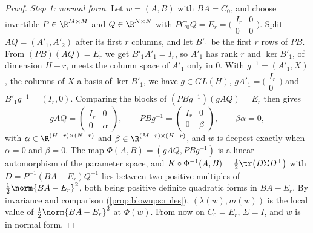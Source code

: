 \begin{refsection}
\begin{proof}
\emph{Step 1: normal form.} Let $w=(A,B)$ with $BA=C_0$, and choose invertible $P\in\R^{M\times M}$ and $Q\in\R^{N\times N}$ with $PC_0Q=E_r=\bigl(\begin{smallmatrix}I_r&0\\0&0\end{smallmatrix}\bigr)$. Split $AQ=(A'_1,A'_2)$ after its first $r$ columns, and let $B'_1$ be the first $r$ rows of $PB$. From $(PB)(AQ)=E_r$ we get $B'_1A'_1=I_r$, so $A'_1$ has rank $r$ and $\ker B'_1$, of dimension $H-r$, meets the column space of $A'_1$ only in $0$. With $g^{-1}=(A'_1,X)$, the columns of $X$ a basis of $\ker B'_1$, we have $g\in GL(H)$, $gA'_1=\bigl(\begin{smallmatrix}I_r\\0\end{smallmatrix}\bigr)$ and $B'_1g^{-1}=(I_r,0)$. Comparing the blocks of $(PBg^{-1})(gAQ)=E_r$ then gives
\[
gAQ=\begin{pmatrix}I_r&0\\0&\alpha\end{pmatrix},\qquad PBg^{-1}=\begin{pmatrix}I_r&0\\0&\beta\end{pmatrix},\qquad\beta\alpha=0,
\]
with $\alpha\in\R^{(H-r)\times(N-r)}$ and $\beta\in\R^{(M-r)\times(H-r)}$, and $w$ is deepest exactly when $\alpha=0$ and $\beta=0$. The map $\Phi(A,B)=(gAQ,PBg^{-1})$ is a linear automorphism of the parameter space, and $K\circ\Phi^{-1}(A,B)=\frac12\tr\bigl(D\Sigma D^\top\bigr)$ with $D=P^{-1}(BA-E_r)Q^{-1}$ lies between two positive multiples of $\frac12\norm{BA-E_r}^2$, both being positive definite quadratic forms in $BA-E_r$. By invariance and comparison (\cref{prop:blowups:rules}), $(\lambda(w),m(w))$ is the local value of $\frac12\norm{BA-E_r}^2$ at $\Phi(w)$. From now on $C_0=E_r$, $\Sigma=I$, and $w$ is in normal form.


\end{proof}
\end{refsection}
